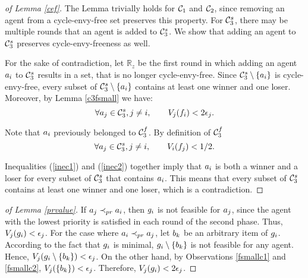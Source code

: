 \begin{proof}[of Lemma \ref{cef}]
The Lemma trivially holds for $\mathcal{C}_1$ and $\mathcal{C}_2$, since removing an agent from a cycle-envy-free set preserves this property. For $\mathcal{C}_3^s$, there may be multiple rounds that an agent is added to $\mathcal{C}_3^s$. We show that adding an agent to $\mathcal{C}_3^s$ preserves cycle-envy-freeness as well.

For the sake of contradiction, let $\mathbb{R}_z$ be the first round in which adding an agent $a_i$ to $\mathcal{C}_3^s$ results in a set, that is no longer cycle-envy-free. Since $\mathcal{C}_3^s \setminus \{a_i\}$ is cycle-envy-free, every subset of $\mathcal{C}_3^s \setminus \{a_i\}$ contains at least one winner and one loser. Moreover, by Lemma \ref{c3fsmall} we have:
\begin{equation}
\label{inec1}
\forall a_j \in \mathcal{C}_3^s, j \neq i, \qquad V_j( f_i )< 2\epsilon_j.
\end{equation}

Note that $a_i$ previously belonged to $\mathcal{C}_3^f$.  By definition of $\mathcal{C}_3^f$  
\begin{equation}
\label{inec2}
\forall a_j \in \mathcal{C}_3^s , j \neq i, \qquad V_i(f_j)< 1/2 .
\end{equation}

Inequalities (\ref{inec1}) and (\ref{inec2}) together imply that $a_i$ is both a winner and a loser for every subset of $\mathcal{C}_3^s$ that contains $a_i$. This means that every subset of $\mathcal{C}_3^s$ contains at least one winner and one loser, which is a contradiction.

\end{proof}

\begin{proof}[of Lemma \ref{prvalue}]

If $a_j \prec_{pr} a_i$, then $g_i$ is not feasible for $a_j$, since the agent with the lowest 
priority is satisfied in each round of the second phase. Thus, $V_j(g_i) < \epsilon_j$. For the case where $a_i \prec_{pr} a_j$, let $b_k$ be an arbitrary item of $g_i$. According to the fact that $g_i$ is minimal, $g_i \setminus \{b_k\}$ is not feasible for any agent. Hence, $V_j(g_i \setminus \{b_k\})< \epsilon_j$. On the other hand, by Observations \ref{fsmallc1} and \ref{fsmallc2}, $V_j(\{b_k\})<\epsilon_j $. Therefore, $V_j(g_i)<2\epsilon_j$. 
\end{proof}

